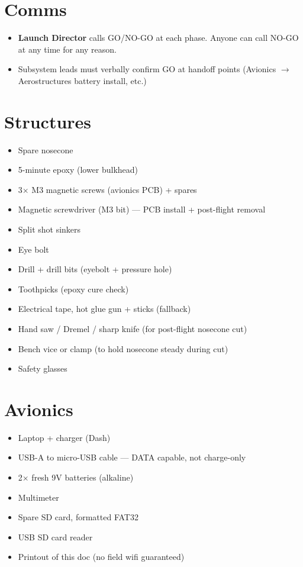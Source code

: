 \documentclass[11pt,a4paper,oneside]{report}
\begin{document}
\section{Comms}
\begin{itemize}
  \item \textbf{Launch Director} calls GO/NO-GO at each phase. Anyone can call NO-GO at any time for any reason.
  \item Subsystem leads must verbally confirm GO at handoff points (Avionics $\to$ Aerostructures battery install, etc.)
\end{itemize}


\section{Structures}
\begin{itemize}
  \item Spare nosecone
  \item 5-minute epoxy (lower bulkhead)
  \item 3$\times$ M3 magnetic screws (avionics PCB) + spares
  \item Magnetic screwdriver (M3 bit) --- PCB install + post-flight removal
  \item Split shot sinkers
  \item Eye bolt
  \item Drill + drill bits (eyebolt + pressure hole)
  \item Toothpicks (epoxy cure check)
  \item Electrical tape, hot glue gun + sticks (fallback)
  \item Hand saw / Dremel / sharp knife (for post-flight nosecone cut)
  \item Bench vice or clamp (to hold nosecone steady during cut)
  \item Safety glasses
\end{itemize}

\section{Avionics}
\begin{itemize}
  \item Laptop + charger (Dash)
  \item USB-A to micro-USB cable --- DATA capable, not charge-only
  \item 2$\times$ fresh 9V batteries (alkaline)
  \item Multimeter
  \item Spare SD card, formatted FAT32
  \item USB SD card reader
  \item Printout of this doc (no field wifi guaranteed)
\end{itemize}
\end{document}
